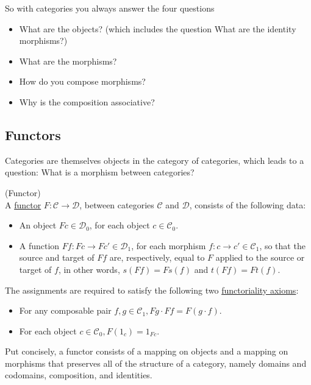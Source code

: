 \noindent So with categories you always answer the four questions
\begin{itemize}\label{category_questions}
\item What are the objects? (which includes the question What are the identity morphisms?)
\item What are the morphisms?
\item How do you compose morphisms?
\item Why is the composition associative?
\end{itemize}

\subsection{Functors}

Categories are themselves objects in the category of categories, which leads to a question: What is a morphism between categories?

\begin{definition}{(Functor)}\label{def:functor}\\
\noindent A \ul{functor} $F : \mathcal{C} \rightarrow \mathcal{D}$, between categories $\mathcal{C}$ and $\mathcal{D}$, consists of the
following data:

\begin{itemize}
\item An object $Fc\in\mathcal{D}_{0}$, for each object $c \in \mathcal{C}_{0}$.
\item A function $Ff : Fc \rightarrow Fc' \in \mathcal{D}_{1}$, for each morphism $f : c \rightarrow c' \in \mathcal{C}_{1}$, so that the
source and target of $Ff$ are, respectively, equal to $F$ applied to the source or target of $f$, in other words,
$s(Ff) = Fs(f)$ and $t(Ff) = Ft(f)$.
\end{itemize}

\noindent The assignments are required to satisfy the following two \ul{functoriality axioms}:
\begin{itemize}\label{functoriality}
\item For any composable pair $f, g \in \mathcal{C}_{1}, Fg \cdot Ff = F(g \cdot f)$.
\item For each object $c \in \mathcal{C}_{0}, F(1_{c}) = 1_{Fc}$.
\end{itemize}

Put concisely, a functor consists of a mapping on objects and a mapping on morphisms that preserves all of the structure of a category,
namely domains and codomains, composition, and identities.
\end{definition}

